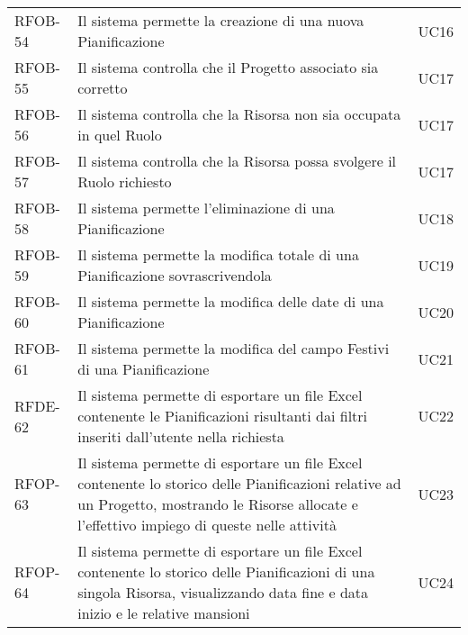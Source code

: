 \begin{center}
\begin{longtable}{p{2.0cm}|p{8cm}|p{2.7cm}}
RFOB-54  & Il sistema permette la creazione di una nuova Pianificazione & UC16 \\  
RFOB-55  & Il sistema controlla che il Progetto associato sia corretto & UC17 \\ 
RFOB-56  & Il sistema controlla che la Risorsa non sia occupata in quel Ruolo & UC17 \\ 
RFOB-57  & Il sistema controlla che la Risorsa possa svolgere il Ruolo richiesto & UC17 \\ 
RFOB-58  & Il sistema permette l'eliminazione di una Pianificazione  & UC18 \\ 
RFOB-59 & Il sistema permette la modifica totale di una Pianificazione sovrascrivendola & UC19\\
RFOB-60 & Il sistema permette la modifica delle date di una Pianificazione & UC20\\
RFOB-61 & Il sistema permette la modifica del campo Festivi di una Pianificazione & UC21\\
RFDE-62 & Il sistema permette di esportare un file Excel contenente le Pianificazioni risultanti dai filtri inseriti dall'utente nella richiesta & UC22\\
\hypertarget{rf63}{RFOP-63} & Il sistema permette di esportare un file Excel contenente lo storico delle Pianificazioni relative ad un Progetto, mostrando le Risorse allocate e l'effettivo impiego di queste nelle attività & UC23\\
\hypertarget{rf64}{RFOP-64} &  Il sistema permette di esportare un file Excel contenente lo storico delle Pianificazioni di una singola Risorsa, visualizzando data fine e data inizio e le relative mansioni & UC24\\


\end{longtable}
\end{center}
